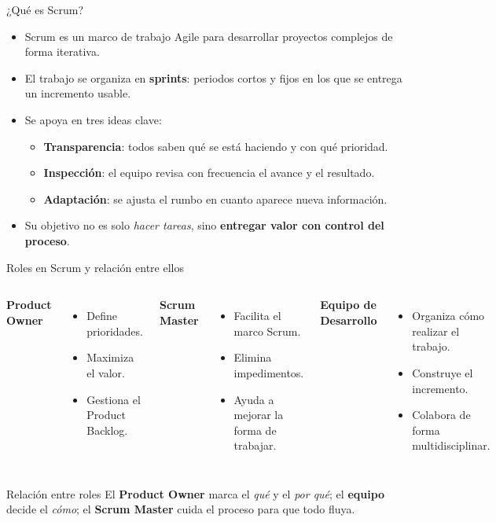 \documentclass{beamer}
\begin{document}
\begin{frame}{¿Qué es Scrum?}
\begin{itemize}
    \item Scrum es un marco de trabajo Agile para desarrollar proyectos complejos de forma iterativa.
    \item El trabajo se organiza en \textbf{sprints}: periodos cortos y fijos en los que se entrega un incremento usable.
    \item Se apoya en tres ideas clave:
    \begin{itemize}
        \item \textbf{Transparencia}: todos saben qué se está haciendo y con qué prioridad.
        \item \textbf{Inspección}: el equipo revisa con frecuencia el avance y el resultado.
        \item \textbf{Adaptación}: se ajusta el rumbo en cuanto aparece nueva información.
    \end{itemize}
    \item Su objetivo no es solo \textit{hacer tareas}, sino \textbf{entregar valor con control del proceso}.
\end{itemize}
\end{frame}

\begin{frame}{Roles en Scrum y relación entre ellos}
\begin{columns}[T,onlytextwidth]
\textbf{Product Owner}
\begin{itemize}
    \item Define prioridades.
    \item Maximiza el valor.
    \item Gestiona el Product Backlog.
\end{itemize}

\textbf{Scrum Master}
\begin{itemize}
    \item Facilita el marco Scrum.
    \item Elimina impedimentos.
    \item Ayuda a mejorar la forma de trabajar.
\end{itemize}

\textbf{Equipo de Desarrollo}
\begin{itemize}
    \item Organiza cómo realizar el trabajo.
    \item Construye el incremento.
    \item Colabora de forma multidisciplinar.
\end{itemize}
\end{columns}

\vspace{0.35cm}
\begin{block}{Relación entre roles}
El \textbf{Product Owner} marca el \textit{qué} y el \textit{por qué}; el \textbf{equipo} decide el \textit{cómo}; el \textbf{Scrum Master} cuida el proceso para que todo fluya.
\end{block}
\end{frame}
\end{document}
